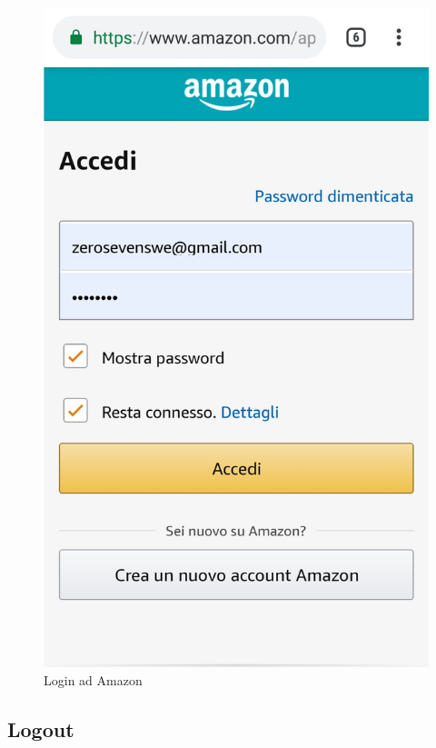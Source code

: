 \begin{figure}[!ht]
	\centering
	\includegraphics[scale=0.2]{images/Autentication.jpg}
	\caption{Login ad Amazon}
\end{figure}
\newpage
\subsection{Logout}

